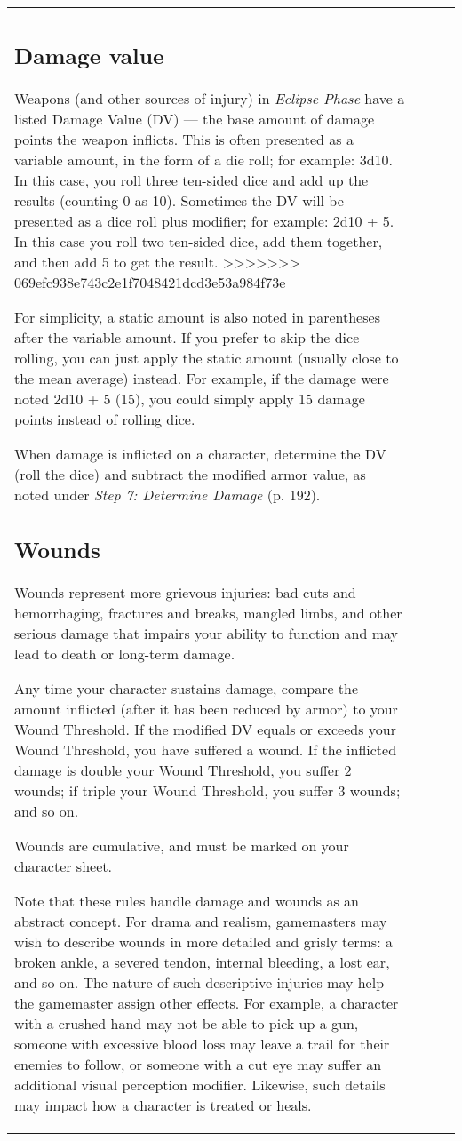 \begin{table}
\begin{tabular}{|p{8cm}|r|r|r|}
\subsection{Damage value} 

Weapons (and other sources of injury) in \emph{Eclipse Phase} have a listed Damage Value (DV) --- the base amount of damage points the weapon inflicts. This is often presented as a variable amount, in the form of a die roll; for example: 3d10. In this case, you roll three ten-sided dice and add up the results (counting 0 as 10). Sometimes the DV will be presented as a dice roll plus modifier; for example: 2d10 + 5. In this case you roll two ten-sided dice, add them together, and then add 5 to get the result. >>>>>>> 069efc938e743c2e1f7048421dcd3e53a984f73e 

For simplicity, a static amount is also noted in parentheses after the variable amount. If you prefer to skip the dice rolling, you can just apply the static amount (usually close to the mean average) instead. For example, if the damage were noted 2d10 + 5 (15), you could simply apply 15 damage points instead of rolling dice. 

When damage is inflicted on a character, determine the DV (roll the dice) and subtract the modified armor value, as noted under \emph{Step 7: Determine Damage} (p. 192). 

\subsection{Wounds} \label{sec:wounds} 

Wounds represent more grievous injuries: bad cuts and hemorrhaging, fractures and breaks, mangled limbs, and other serious damage that impairs your ability to function and may lead to death or long-term damage. 

Any time your character sustains damage, compare the amount inflicted (after it has been reduced by armor) to your Wound Threshold. If the modified DV equals or exceeds your Wound Threshold, you have suffered a wound. If the inflicted damage is double your Wound Threshold, you suffer 2 wounds; if triple your Wound Threshold, you suffer 3 wounds; and so on. 

Wounds are cumulative, and must be marked on your character sheet. 

Note that these rules handle damage and wounds as an abstract concept. For drama and realism, gamemasters may wish to describe wounds in more detailed and grisly terms: a broken ankle, a severed tendon, internal bleeding, a lost ear, and so on. The nature of such descriptive injuries may help the gamemaster assign other effects. For example, a character with a crushed hand may not be able to pick up a gun, someone with excessive blood loss may leave a trail for their enemies to follow, or someone with a cut eye may suffer an additional visual perception modifier. Likewise, such details may impact how a character is treated or heals. 


\end{tabular}
\end{table}
